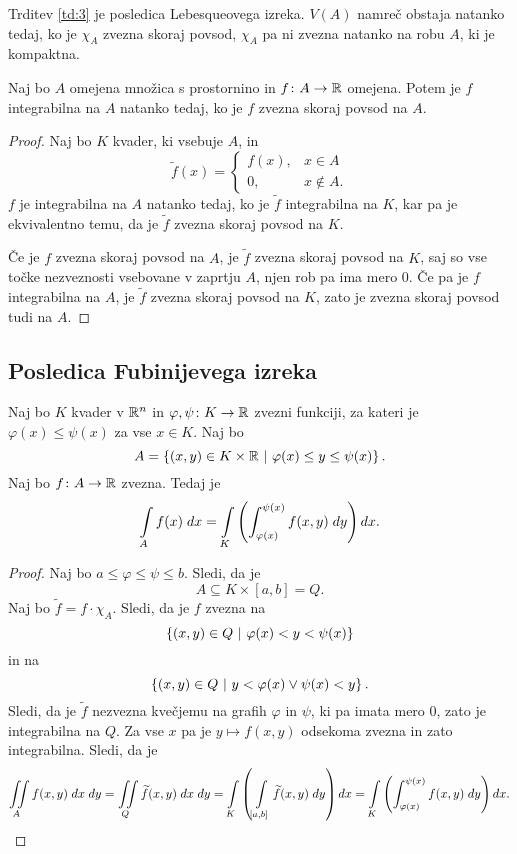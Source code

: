 \begin{opomba}
Trditev \ref{td:3} je posledica Lebesqueovega izreka. $V(A)$ namreč
obstaja natanko tedaj, ko je $\chi_A $ zvezna skoraj povsod,
$\chi_A$ pa ni zvezna natanko na robu $A$, ki je kompaktna.
\end{opomba}

\begin{trditev}
Naj bo $A$ omejena množica s prostornino in $f \colon A \to \mathbb{R}$
omejena. Potem je $f$ integrabilna na $A$ natanko tedaj, ko je $f$
zvezna skoraj povsod na $A$.
\end{trditev}

\begin{proof}
Naj bo $K$ kvader, ki vsebuje $A$, in
\[
\widetilde{f}(x) = \begin{cases}
f(x), &x \in A
\\
0, &x \not \in A.
\end{cases}
\]
$f$ je integrabilna na $A$ natanko tedaj, ko je $\widetilde{f}$
integrabilna na $K$, kar pa je ekvivalentno temu, da je
$\widetilde{f}$ zvezna skoraj povsod na $K$.

Če je $f$ zvezna skoraj povsod na $A$, je $\widetilde{f}$ zvezna
skoraj povsod na $K$, saj so vse točke nezveznosti vsebovane v
zaprtju $A$, njen rob pa ima mero $0$. Če pa je $f$ integrabilna
na $A$, je $\widetilde{f}$ zvezna skoraj povsod na $K$, zato je
zvezna skoraj povsod tudi na $A$.
\end{proof}

\newpage

\subsection{Posledica Fubinijevega izreka}

\begin{trditev}
Naj bo $K$ kvader v $\mathbb{R}^{n}$ in
$\varphi, \psi \colon K \to \mathbb{R}$ zvezni funkciji, za kateri je
$\varphi(x) \leq \psi(x)$ za vse $x \in K$. Naj bo
\[
A = \left\{(x,y) \in K \times \mathbb{R}~\middle\vert~\varphi(x) \leq y \leq \psi(x)\right\}.
\]
Naj bo $f \colon A \to \mathbb{R}$ zvezna. Tedaj je
\[
\int\limits_A f(x)\;dx =
\int\limits_K \left( \int_{\varphi(x)}^{\psi(x)} f(x,y)\;dy\right)dx.
\]
\end{trditev}

\begin{proof}
Naj bo $a \leq \varphi \leq \psi \leq b$. Sledi, da je
\[
A \subseteq K \times [a,b] = Q.
\]
Naj bo $\widetilde{f} = f \cdot \chi_A$. Sledi, da je $f$ zvezna na
\[
\left\{(x,y) \in Q~\middle\vert~\varphi(x) < y < \psi(x)\right\}
\]
in na
\[
\left\{(x,y) \in Q~\middle\vert~y < \varphi(x) \lor \psi(x) < y\right\}.
\]
Sledi, da je $\widetilde{f}$ nezvezna kvečjemu na grafih $\varphi$
in $\psi$, ki pa imata mero $0$, zato je integrabilna na $Q$. Za
vse $x$ pa je $y \mapsto f(x,y)$ odsekoma zvezna in zato
integrabilna. Sledi, da je
\[
\iint\limits_A f(x,y)\;dx\;dy =
\iint\limits_Q \widetilde{f}(x,y)\;dx\;dy =
\int\limits_K \left(\int\limits_{[a,b]} \widetilde{f}(x,y)\;dy\right)dx =
\int\limits_K \left( \int_{\varphi(x)}^{\psi(x)} f(x,y)\;dy\right)dx.
\qedhere
\]
\end{proof}

